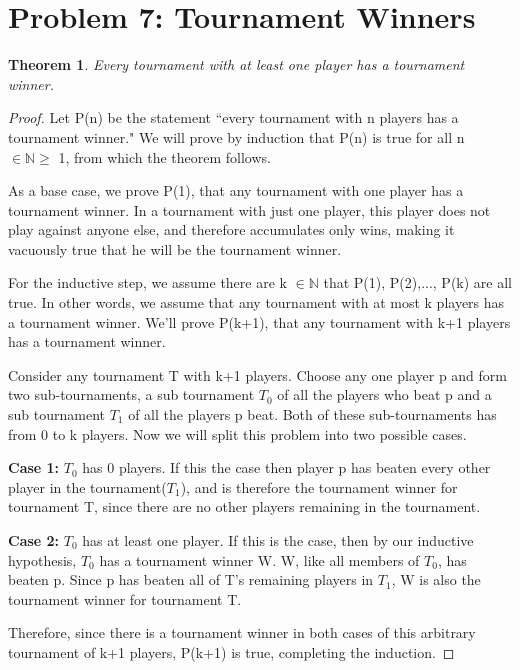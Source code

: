 \documentclass[10pt,letter]{article}
\newtheorem*{thm}{Theorem}
\begin{document}
\section*{Problem 7: Tournament Winners}
\begin{thm}
Every tournament with at least one player has a tournament winner. 
\end{thm}
\begin{proof}
Let P(n) be the statement ``every tournament with n players has a tournament winner." We will prove by induction that P(n) is true for all n $\in \mathbb{N} \geq$ 1, from which the theorem follows.

As a base case, we prove P(1), that any tournament with one player has a tournament winner. In a tournament with just one player, this player does not play against anyone else, and therefore accumulates only wins, making it vacuously true that he will be the tournament winner. 

For the inductive step, we assume there are k  $\in \mathbb{N}$ that P(1), P(2),..., P(k) are all true. In other words, we assume that any tournament with at most k players has a tournament winner. We'll prove P(k+1), that any tournament with k+1 players has a tournament winner. 

Consider any tournament T with k+1 players. Choose any one player p and form two sub-tournaments, a sub tournament $T_0$ of all the players who beat p and a sub tournament $T_1$ of all the players p beat. Both of these sub-tournaments has from 0 to k players. Now we will split this problem into two possible cases. 

\textbf{Case 1:} $T_0$ has 0 players. If this the case then player p has beaten every other player in the tournament($T_1$), and is therefore the tournament winner for tournament T, since there are no other players remaining in the tournament.  

\textbf{Case 2:} $T_0$ has at least one player. If this is the case, then by our inductive hypothesis, $T_0$ has a tournament winner W. W, like all members of $T_0$, has beaten p. Since p has beaten all of T's remaining players in $T_1$, W is also the tournament winner for tournament T. 

Therefore, since there is a tournament winner in both cases of this arbitrary tournament of k+1 players, P(k+1) is true, completing the induction. 

\end{proof}


\end{document}
